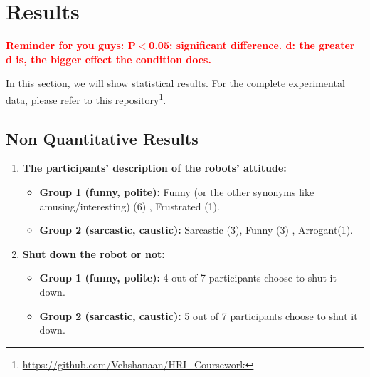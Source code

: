 \documentclass[conference]{IEEEtran}
\begin{document}
\section{Results}

\textbf{\textcolor{red}{Reminder for you guys: P$<$0.05: significant difference. d: the greater d is, the bigger effect the condition does.}}

In this section, we will show statistical results. For the complete experimental data, please refer to this repository\footnote[1]{\url{https://github.com/Vehshanaan/HRI_Coursework}}.

\subsection{Non Quantitative Results}



\begin{enumerate}
    \item \textbf{The participants' description of the robots' attitude:}
    \begin{itemize}
    \item \textbf{Group 1 (funny, polite):} Funny (or the other synonyms like amusing/interesting) (6) , Frustrated (1).
    \item \textbf{Group 2 (sarcastic, caustic):} Sarcastic (3), Funny (3) , Arrogant(1). 
    \end{itemize}
    \item \textbf{Shut down the robot or not:}
    \begin{itemize}
    \item \textbf{Group 1 (funny, polite):} 4 out of 7 participants choose to shut it down.
    \item \textbf{Group 2 (sarcastic, caustic):} 5 out of 7 participants choose to shut it down. 
    \end{itemize}
\end{enumerate}
\end{document}
